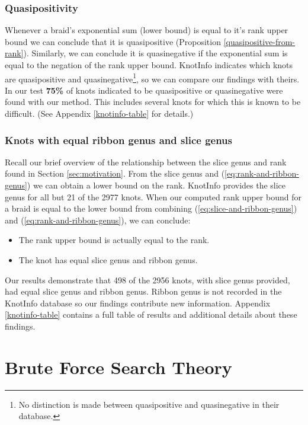 \documentclass[12pt]{thesis}
\begin{document}
\subsection{Quasipositivity}

Whenever a braid's exponential sum (lower bound) is equal to it's rank upper bound 
we can conclude that it is quasipositive (Proposition \ref{quasipositive-from-rank}).
Similarly, we can conclude it is quasinegative if the exponential sum is equal to the negation of the rank upper bound.
KnotInfo indicates which knots are quasipositive and quasinegative\footnote{No distinction is made between quasipositive and quasinegative in their database.}, so we can compare our findings with theirs.
In our test \textbf{75\%} of knots indicated to be quasipositive or quasinegative were found with our method.
This includes several knots for which this is known to be difficult.
(See Appendix \ref{knotinfo-table} for details.)

\subsection{Knots with equal ribbon genus and slice genus}

Recall our brief overview of the relationship between
the slice genus and rank found in Section \ref{sec:motivation}.
From the slice genus and (\ref{eq:rank-and-ribbon-genus})
we can obtain a lower bound on the rank.
KnotInfo provides the slice genus for all
but 21 of the 2977 knots.
When our computed rank upper bound for a braid is equal to the lower bound
from combining (\ref{eq:slice-and-ribbon-genus}) and (\ref{eq:rank-and-ribbon-genus}), we can conclude:
\begin{itemize}
    \item The rank upper bound is actually equal to the rank.
    \item The knot has equal slice genus and ribbon genus.
\end{itemize}

Our results demonstrate that 498 of the 2956 knots, with slice genus provided,
had equal slice genus and ribbon genus.
Ribbon genus is not recorded in the KnotInfo database
so our findings contribute new information.
Appendix \ref{knotinfo-table} contains a full table of results and
 additional details about these findings.

\chapter{Brute Force Search Theory}
\end{document}
